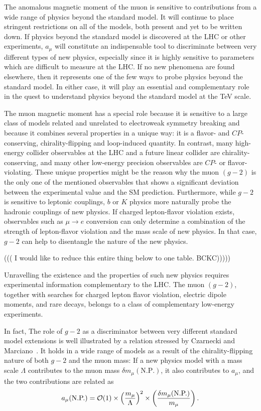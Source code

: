 The anomalous magnetic moment of the muon is sensitive to
contributions from a wide range of physics beyond the standard
model. It  will continue to place stringent restrictions on all of
the models, both present and yet to be written down. If  
physics beyond the standard model is discovered at the LHC 
or other experiments,
$a_\mu$  will constitute an indispensable tool to discriminate
between very different types of new physics, especially since it is
highly sensitive to parameters which are difficult to measure at the
LHC. If no new phenomena are found elsewhere, then it represents one of the few ways
to probe physics beyond the standard model. In either case, it will play an
essential and complementary role in the quest to understand physics
beyond the standard model at the TeV scale. 

The muon magnetic moment has a special role because it is
sensitive to a large class of models related and unrelated to electroweak symmetry breaking and
because it combines several properties in a unique way: it is a
flavor- and $C\!P$-conserving, chirality-flipping and loop-induced 
quantity. In contrast, many high-energy collider observables at the
LHC and a future linear collider are chirality-conserving, and many
other low-energy precision observables are $C\!P$- or
flavor-violating. These unique properties might be the reason why the
muon $(g-2)$ is the only one of the mentioned observables that shows a 
significant deviation between the experimental value and the SM
prediction.  Furthermore, while $g-2$ is sensitive
to leptonic couplings, 
$b$ or $K$ physics more naturally probe the hadronic couplings of new
physics. If charged lepton-flavor violation exists, observables such
as $\mu\to e$ conversion can only determine a combination of the
strength of lepton-flavor violation and the mass scale of new
physics. In that case, $g-2$ can help to disentangle the nature of the
new physics. 


((( I would like to reduce this entire thing below to one table.  BCKC)))))

Unravelling the existence and the properties of such new physics
requires experimental information complementary to the LHC.
The muon $(g-2)$, together
with searches for charged lepton flavor violation, electric dipole
moments, and rare decays, belongs to a class of complementary
low-energy experiments.

In fact, 
The role of $g-2$ as a discriminator between very different standard
model extensions is well illustrated by a relation stressed by
Czarnecki and Marciano~\cite{czmar}. It holds in a wide range of
models as a result of the chirality-flipping nature of both  $g-2$ and
the muon mass: If a new
physics model with a mass scale $\Lambda$
contributes to the muon mass $\delta m_\mu(\mbox{N.P.})$, it also
contributes to $a_\mu$, and the two contributions are related as
\begin{equation}
\label{CzMbound} a_\mu(\mbox{N.P.})={\cal O}(1)\times
\left(\frac{m_\mu}{\Lambda}\right)^2 \times \left(\frac{\delta
m_\mu(\mbox{N.P.})}{m_\mu}\right). 
\end{equation}

